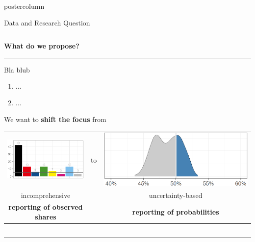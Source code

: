 \documentclass[final,hyperref={pdfpagelabels=false}]{beamer}
\newcommand{\bfBlue}[1]{\textcolor{koaladarkestblue}{\textbf{#1}}}
\newcommand{\colHeader}[1]{
  \vspace{-3ex}
  \begin{center}
  \bfBlue{#1}
  \end{center}
  \vspace{-2ex}
  \textcolor{koalablue}{\hrule{}}
  \vspace{2ex}
}
\begin{document}
\begin{frame}
\begin{columns}
\begin{column}{1\textwidth}
\begin{beamercolorbox}[center,wd=\textwidth]{postercolumn}
\begin{minipage}[T]{.95\textwidth}
\begin{block}{\footnotesize Data and Research Question}
\begin{columns}[t]
  \begin{column}{.35\textwidth}
  \colHeader{What do we propose?}
   Bla blub
  \begin{enumerate}
    \item ...
    \item ...
  \end{enumerate}
  \begin{center}
  We want to \bfBlue{shift the focus} from \\[2ex]
  \begin{tabular}{ccc}
  \includegraphics[height=10ex]{figures/motivation_bars}
  &
  to
  &
  \includegraphics[height=10ex]{figures/motivation_density}
  \\
  incomprehensive & & uncertainty-based \\
  \bfBlue{reporting of observed shares} & & \bfBlue{reporting of probabilities} \\
  \end{tabular}
  \end{center}
  \vspace{1ex}
  \end{column}

  \end{columns}

  \vspace{2ex}
  \textcolor{LMUlightgray}{\hrule{}}
  \vspace{2ex}

  \begin{columns}[t]


\end{columns}
\end{block}
\end{minipage}
\end{beamercolorbox}
\end{column}
\end{columns}
\end{frame}
\end{document}
